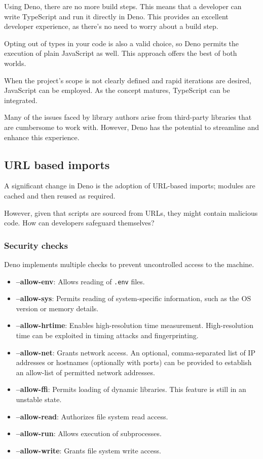\documentclass[10pt,journal,compsoc]{IEEEtran}
\begin{document}
Using Deno, there are no more build steps. This means that a developer can write TypeScript and run it directly in Deno. This provides an excellent developer experience, as there's no need to worry about a build step.

Opting out of types in your code is also a valid choice, so Deno permits the execution of plain JavaScript as well. This approach offers the best of both worlds.

When the project's scope is not clearly defined and rapid iterations are desired, JavaScript can be employed. As the concept matures, TypeScript can be integrated.

Many of the issues faced by library authors arise from third-party libraries that are cumbersome to work with. However, Deno has the potential to streamline and enhance this experience.

\subsection{URL based imports}

A significant change in Deno is the adoption of URL-based imports; modules are cached and then reused as required.

However, given that scripts are sourced from URLs, they might contain malicious code. How can developers safeguard themselves?

\subsubsection{Security checks}

Deno implements multiple checks to prevent uncontrolled access to the machine. \cite{DenoSec}

\begin{itemize}
    \item \textbf{--allow-env}: Allows reading of \verb|.env| files.
    \item \textbf{--allow-sys}: Permits reading of system-specific information, such as the OS version or memory details.
    \item \textbf{--allow-hrtime}: Enables high-resolution time measurement. High-resolution time can be exploited in timing attacks and fingerprinting.
    \item \textbf{--allow-net}: Grants network access. An optional, comma-separated list of IP addresses or hostnames (optionally with ports) can be provided to establish an allow-list of permitted network addresses.
    \item \textbf{--allow-ffi}: Permits loading of dynamic libraries. This feature is still in an unstable state.
    \item \textbf{--allow-read}: Authorizes file system read access.
    \item \textbf{--allow-run}: Allows execution of subprocesses.
    \item \textbf{--allow-write}: Grants file system write access.
\end{itemize}
\end{document}
